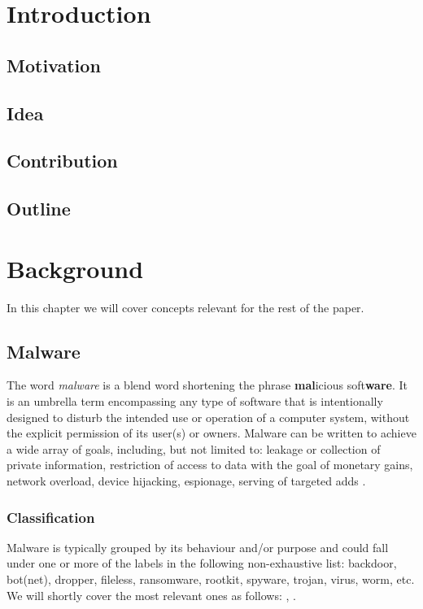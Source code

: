 \chapter{Introduction}

\section{Motivation}

\section{Idea}

\section{Contribution}

\section{Outline}

\chapter{Background}

In this chapter we will cover concepts relevant for the rest of the paper. %

\section{Malware}

The word \emph{malware} is a blend word shortening the phrase \textbf{mal}icious soft\textbf{ware}. It is an umbrella term encompassing any type of software that is intentionally designed to disturb the intended use or operation of a computer system, without the explicit permission of its user(s) or owners. Malware can be written to achieve a wide array of goals, including, but not limited to: leakage or collection of private information, restriction of access to data with the goal of monetary gains, network overload, device hijacking, espionage, serving of targeted adds \cite{wiki_malware}.

\subsection{Classification}

Malware is typically grouped by its behaviour and/or purpose and could fall under one or more of the labels in the following non-exhaustive list: backdoor, bot(net), dropper, fileless, ransomware, rootkit, spyware, trojan, virus, worm, etc. We will shortly cover the most relevant ones as follows: \cite{wiki_malware}, \cite{zeusvm}.

